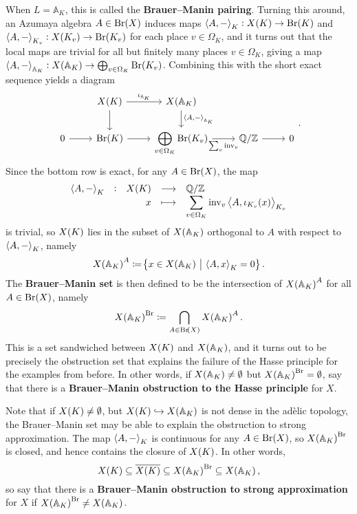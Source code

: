 \documentclass{article}
\theoremstyle{plain}
\theoremstyle{definition}
\renewcommand{\AA}{\mathbb{A}}
\newcommand{\Br}{\mathrm{Br}}
\newcommand{\inv}{\mathrm{inv}}
\newcommand{\QQ}{\mathbb{Q}}
\newcommand{\ZZ}{\mathbb{Z}}
\newcommand{\abr}[2][-1]{\ensuremath{\mathinner{\ifthenelse{\equal{#1}{-1}}{\left\langle#2\right\rangle}{}\ifthenelse{\equal{#1}{1}}{\bigl\langle#2\bigr\rangle}{}}}}
\newcommand{\br}{\!\del}
\newcommand{\st}{\ \middle| \ }
\newcommand{\function}[5]{
  \begin{array}{rcrcl}
    #1 & : & \displaystyle #2 & \longrightarrow & \displaystyle #3 \\
       &   & \displaystyle #4 & \longmapsto     & \displaystyle #5
  \end{array}
}
\begin{document}
\pagebreak

When $ L = \AA_K $, this is called the \textbf{Brauer--Manin pairing}. Turning this around, an Azumaya algebra $ A \in \Br\br{X} $ induces maps $ \abr{A, -}_K : X\br{K} \to \Br\br{K} $ and $ \abr{A, -}_{K_v} : X\br{K_v} \to \Br\br{K_v} $ for each place $ v \in \Omega_K $, and it turns out that the local maps are trivial for all but finitely many places $ v \in \Omega_K $, giving a map $ \abr{A, -}_{\AA_K} : X\br{\AA_K} \to \bigoplus_{v \in \Omega_K} \Br\br{K_v} $. Combining this with the short exact sequence yields a diagram
$$
\begin{tikzcd}
& X\br{K} \arrow{r}{\iota_{\AA_K}} \arrow{d} & X\br{\AA_K} \arrow{d}{\abr{A, -}_{\AA_K}} & & \\
0 \arrow{r} & \Br\br{K} \arrow{r} & \displaystyle\bigoplus_{v \in \Omega_K} \Br\br{K_v} \arrow{r}[swap]{\sum_v \inv_v} & \QQ / \ZZ \arrow{r} & 0
\end{tikzcd}.
$$
Since the bottom row is exact, for any $ A \in \Br\br{X} $, the map
$$ \function{\abr{A, -}_K}{X\br{K}}{\QQ / \ZZ}{x}{\sum_{v \in \Omega_K} \inv_v\abr{A, \iota_{K_v}\br{x}}_{K_v}} $$
is trivial, so $ X\br{K} $ lies in the subset of $ X\br{\AA_K} $ orthogonal to $ A $ with respect to $ \abr{A, -}_K $, namely
$$ X\br{\AA_K}^A \coloneqq \cbr{x \in X\br{\AA_K} \st \abr{A, x}_K = 0}. $$
The \textbf{Brauer--Manin set} is then defined to be the intersection of $ X\br{\AA_K}^A $ for all $ A \in \Br\br{X} $, namely
$$ X\br{\AA_K}^\Br \coloneqq \bigcap_{A \in \Br\br{X}} X\br{\AA_K}^A. $$
This is a set sandwiched between $ X\br{K} $ and $ X\br{\AA_K} $, and it turns out to be precisely the obstruction set that explains the failure of the Hasse principle for the examples from before. In other words, if $ X\br{\AA_K} \ne \emptyset $ but $ X\br{\AA_K}^\Br = \emptyset $, say that there is a \textbf{Brauer--Manin obstruction to the Hasse principle} for $ X $.

Note that if $ X\br{K} \ne \emptyset $, but $ X\br{K} \hookrightarrow X\br{\AA_K} $ is not dense in the ad\`elic topology, the Brauer--Manin set may be able to explain the obstruction to strong approximation. The map $ \abr{A, -}_K $ is continuous for any $ A \in \Br\br{X} $, so $ X\br{\AA_K}^\Br $ is closed, and hence contains the closure of $ X\br{K} $. In other words,
$$ X\br{K} \subseteq \overline{X\br{K}} \subseteq X\br{\AA_K}^\Br \subseteq X\br{\AA_K}, $$
so say that there is a \textbf{Brauer--Manin obstruction to strong approximation} for $ X $ if $ X\br{\AA_K}^\Br \ne X\br{\AA_K} $.
\end{document}
